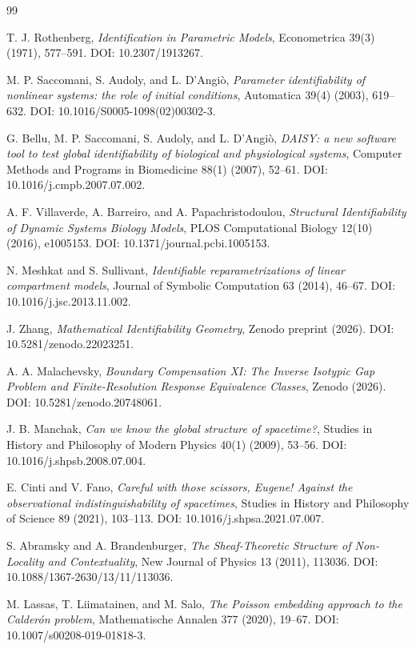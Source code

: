 \documentclass[11pt]{article}
\begin{document}
\begin{thebibliography}{99}

T. J. Rothenberg,
\emph{Identification in Parametric Models},
Econometrica 39(3) (1971), 577--591.
DOI: 10.2307/1913267.

M. P. Saccomani, S. Audoly, and L. D'Angi\`o,
\emph{Parameter identifiability of nonlinear systems: the role of initial conditions},
Automatica 39(4) (2003), 619--632.
DOI: 10.1016/S0005-1098(02)00302-3.

G. Bellu, M. P. Saccomani, S. Audoly, and L. D'Angi\`o,
\emph{DAISY: a new software tool to test global identifiability of biological
and physiological systems},
Computer Methods and Programs in Biomedicine 88(1) (2007), 52--61.
DOI: 10.1016/j.cmpb.2007.07.002.

A. F. Villaverde, A. Barreiro, and A. Papachristodoulou,
\emph{Structural Identifiability of Dynamic Systems Biology Models},
PLOS Computational Biology 12(10) (2016), e1005153.
DOI: 10.1371/journal.pcbi.1005153.

N. Meshkat and S. Sullivant,
\emph{Identifiable reparametrizations of linear compartment models},
Journal of Symbolic Computation 63 (2014), 46--67.
DOI: 10.1016/j.jsc.2013.11.002.

J. Zhang,
\emph{Mathematical Identifiability Geometry},
Zenodo preprint (2026).
DOI: 10.5281/zenodo.22023251.

A. A. Malachevsky,
\emph{Boundary Compensation XI: The Inverse Isotypic Gap Problem and
Finite-Resolution Response Equivalence Classes},
Zenodo (2026).
DOI: 10.5281/zenodo.20748061.

J. B. Manchak,
\emph{Can we know the global structure of spacetime?},
Studies in History and Philosophy of Modern Physics 40(1) (2009), 53--56.
DOI: 10.1016/j.shpsb.2008.07.004.

E. Cinti and V. Fano,
\emph{Careful with those scissors, Eugene! Against the observational
indistinguishability of spacetimes},
Studies in History and Philosophy of Science 89 (2021), 103--113.
DOI: 10.1016/j.shpsa.2021.07.007.

S. Abramsky and A. Brandenburger,
\emph{The Sheaf-Theoretic Structure of Non-Locality and Contextuality},
New Journal of Physics 13 (2011), 113036.
DOI: 10.1088/1367-2630/13/11/113036.

M. Lassas, T. Liimatainen, and M. Salo,
\emph{The Poisson embedding approach to the Calder\'on problem},
Mathematische Annalen 377 (2020), 19--67.
DOI: 10.1007/s00208-019-01818-3.

\end{thebibliography}
\end{document}
